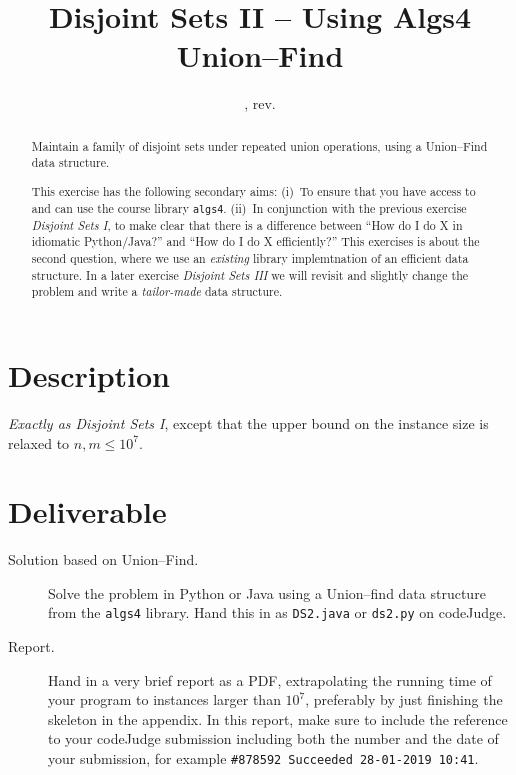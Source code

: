 \documentclass{tufte-handout}
\title{Disjoint Sets II -- Using Algs4 Union--Find}
\author{}
\date{\GITAuthorDate, rev. \GITAbrHash}
\begin{document}
\maketitle

\begin{abstract}
  Maintain a family of disjoint sets under repeated union operations, using a Union--Find data structure.

  This exercise has the following secondary aims:
  (i)~To ensure that you have access to and can use the course library \texttt{algs4}.
  (ii)~In conjunction with the previous exercise \emph{Disjoint Sets I}, to make clear that there is a difference between ``How do I do X in idiomatic Python/Java?'' and ``How do I do X efficiently?''
  This exercises is about the second question, where we use an \emph{existing} library implemtnation of an efficient data structure.
  In a later exercise \emph{Disjoint Sets III} we will revisit and slightly change the problem and write a \emph{tailor-made} data structure.
\end{abstract}

\section{Description}

\emph{Exactly as Disjoint Sets I}, except that the upper bound on the instance size is relaxed to $n,m\leq 10^7$.

\section{Deliverable}

\begin{description}
  \item[Solution based on Union--Find.]
    Solve the problem in Python or Java using a Union--find data structure from the \texttt{algs4} library.
    Hand this in as \texttt{DS2.java} or \texttt{ds2.py} on codeJudge.
  \item[Report.]
    Hand in a very brief report as a PDF, extrapolating the running time of your program to instances larger than $10^7$, preferably by just finishing the skeleton in the appendix.
    In this report, make sure to include the reference to your codeJudge submission including both the number and the date of your submission, for example \verb+#878592 Succeeded 28-01-2019 10:41+.
\end{description}
\end{document}
